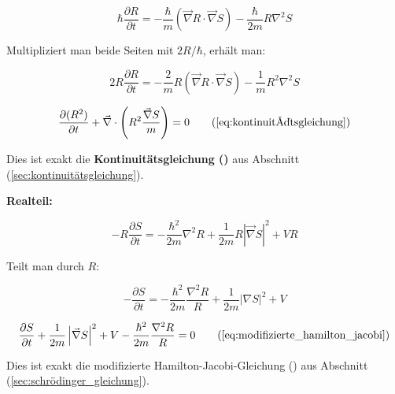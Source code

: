 \begin{equation}
    \hbar \frac{\partial R}{\partial t} = -\frac{\hbar}{m} (\vec{\nabla} R \cdot \vec{\nabla} S) - \frac{\hbar}{2m} R \nabla^2 S
\end{equation}

Multipliziert man beide Seiten mit $2R/\hbar$, erhält man:

\begin{equation}
    2R \frac{\partial R}{\partial t} = -\frac{2}{m} R (\vec{\nabla} R \cdot \vec{\nabla} S) - \frac{1}{m} R^2 \nabla^2 S
\end{equation}

\begin{equation}
    \frac{\partial (R^2)}{\partial t} + \vec{\nabla} \cdot \left( R^2 \frac{\vec{\nabla} S}{m} \right) = 0 \tag{\refeq{eq:kontinuitätsgleichung}}
\end{equation}

Dies ist exakt die \textbf{Kontinuitätsgleichung ()} aus Abschnitt (\ref{sec:kontinuitätsgleichung}).

\textbf{Realteil:}

\begin{equation}
    - R \frac{\partial S}{\partial t} = -\frac{\hbar^2}{2m} \nabla^2 R + \frac{1}{2m} R \left| \vec{\nabla} S \right|^2 + V R
\end{equation}

Teilt man durch $R$:

\begin{equation}
    - \frac{\partial S}{\partial t} = -\frac{\hbar^2}{2m} \frac{\nabla^2 R}{R} + \frac{1}{2m} |\nabla S|^2 + V
\end{equation}

\begin{equation}
    \frac{\partial S}{\partial t} + \frac{1}{2m} \left| \vec{\nabla} S \right|^2 + V - \frac{\hbar^2}{2m} \frac{\nabla^2 R}{R} = 0 \tag{\refeq{eq:modifizierte_hamilton_jacobi}}
\end{equation}

Dies ist exakt die modifizierte Hamilton-Jacobi-Gleichung () aus Abschnitt (\ref{sec:schrödinger_gleichung}).
